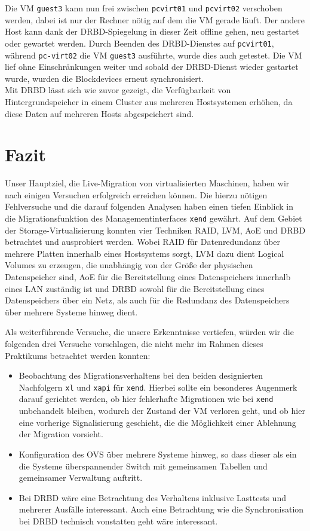Die VM \verb|guest3| kann nun frei zwischen \verb#pcvirt01# und \verb#pcvirt02# verschoben werden, dabei ist nur der Rechner nötig auf dem die VM gerade läuft. Der andere Host kann dank der DRBD-Spiegelung in dieser Zeit offline gehen, neu gestartet oder gewartet werden. Durch Beenden des DRBD-Dienstes auf \verb#pcvirt01#, während \verb#pc-virt02# die VM \verb#guest3# ausführte, wurde dies auch getestet. Die VM lief ohne Einschränkungen weiter und sobald der DRBD-Dienst wieder gestartet wurde, wurden die Blockdevices erneut synchronisiert.
\\
Mit DRBD lässt sich wie zuvor gezeigt, die Verfügbarkeit von Hintergrundspeicher in einem Cluster aus mehreren Hostsystemen erhöhen, da diese Daten auf mehreren Hosts abgespeichert sind.

\chapter{Fazit}
Unser Hauptziel, die Live-Migration von virtualisierten Maschinen, haben
wir nach einigen Versuchen erfolgreich erreichen können. Die hierzu nötigen Fehlversuche und die darauf folgenden Analysen haben einen tiefen Einblick in die Migrationsfunktion des Managementinterfaces \verb#xend# gewährt. Auf dem Gebiet der Storage-Virtualisierung konnten vier Techniken RAID, LVM, AoE und DRBD betrachtet und ausprobiert werden. Wobei RAID für Datenredundanz über mehrere Platten innerhalb eines Hostsystems sorgt, LVM dazu dient Logical Volumes zu erzeugen, die unabhängig von der Größe der physischen Datenspeicher sind, AoE für die Bereitstellung eines Datenspeichers innerhalb eines LAN zuständig ist und DRBD sowohl für die Bereitstellung eines Datenspeichers über ein Netz, als auch für die Redundanz des Datenspeichers über mehrere Systeme hinweg dient.

Als weiterführende Versuche, die unsere Erkenntnisse vertiefen, würden wir die folgenden drei Versuche vorschlagen, die nicht mehr im Rahmen dieses Praktikums betrachtet werden konnten:
\begin{itemize}
	\item Beobachtung des Migrationsverhaltens bei den beiden designierten Nachfolgern \verb#xl# und \verb#xapi# für \verb#xend#. Hierbei sollte ein besonderes Augenmerk darauf gerichtet werden, ob hier fehlerhafte Migrationen wie bei \verb#xend# unbehandelt bleiben, wodurch der Zustand der VM verloren geht, und ob hier eine vorherige Signalisierung geschieht, die die Möglichkeit einer Ablehnung der Migration vorsieht.
	\item Konfiguration des OVS über mehrere Systeme hinweg, so dass dieser als ein die Systeme überspannender Switch mit gemeinsamen Tabellen und gemeinsamer Verwaltung auftritt.
	\item Bei DRBD wäre eine Betrachtung des Verhaltens inklusive Lasttests und mehrerer Ausfälle interessant. Auch eine Betrachtung wie die Synchronisation bei DRBD technisch vonstatten geht wäre interessant.  
\end{itemize}

